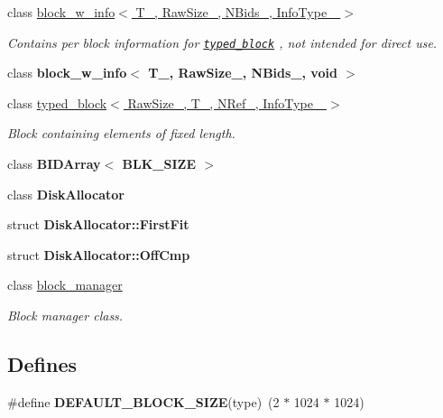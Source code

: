 \begin{CompactItemize}
class \hyperlink{classblock__w__info}{block\_\-w\_\-info$<$ T\_\-, RawSize\_\-, NBids\_\-, InfoType\_\- $>$}
\begin{CompactList}\small\item\em Contains per block information for {\tt \hyperlink{classtyped__block}{typed\_\-block}} , not intended for direct use. \item\end{CompactList}\item 
class \textbf{block\_\-w\_\-info$<$ T\_\-, RawSize\_\-, NBids\_\-, void $>$}
\item 
class \hyperlink{classtyped__block}{typed\_\-block$<$ RawSize\_\-, T\_\-, NRef\_\-, InfoType\_\- $>$}
\begin{CompactList}\small\item\em Block containing elements of fixed length. \item\end{CompactList}\item 
class \textbf{BIDArray$<$ BLK\_\-SIZE $>$}
\item 
class \textbf{DiskAllocator}
\item 
struct \textbf{DiskAllocator::FirstFit}
\item 
struct \textbf{DiskAllocator::OffCmp}
\item 
class \hyperlink{classblock__manager}{block\_\-manager}
\begin{CompactList}\small\item\em Block manager class. \item\end{CompactList}\end{CompactItemize}
\subsection*{Defines}
\begin{CompactItemize}
\item 
\hypertarget{group__mnglayer_g24dae4b7fb37cad43ac1395c30b432bb}{
\#define \textbf{DEFAULT\_\-BLOCK\_\-SIZE}(type)~(2 $\ast$ 1024 $\ast$ 1024)}
\label{group__mnglayer_g24dae4b7fb37cad43ac1395c30b432bb}

\end{CompactItemize}
